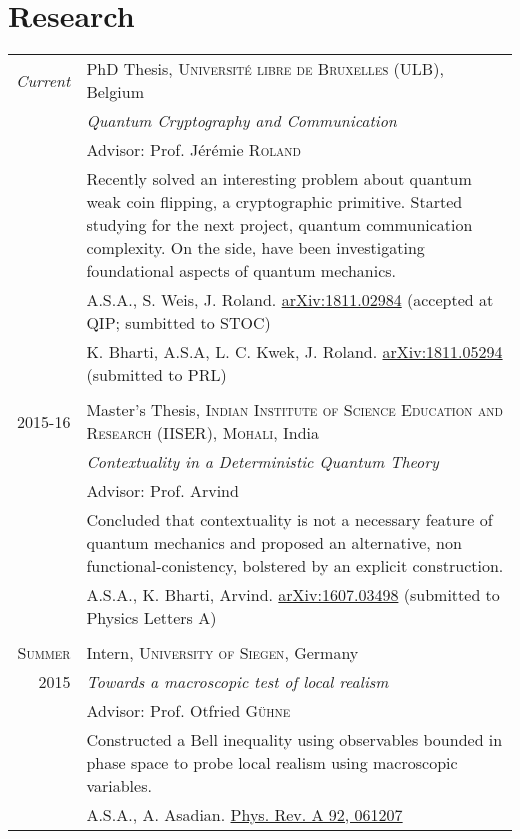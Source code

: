 \documentclass[a4paper,10pt]{article}
\begin{document}
\section{Research}
\begin{tabular}{r|p{11cm}}
 \emph{Current}     & PhD Thesis, \textsc{Université libre de Bruxelles (ULB)}, Belgium \\
                    &\emph{Quantum Cryptography and Communication} \\
                    &\small Advisor: Prof. Jérémie \textsc{Roland}\\
 &\footnotesize{  Recently solved an interesting problem about quantum weak coin flipping, a cryptographic primitive.
                  Started studying for the next project, quantum communication complexity.
                  On the side, have been investigating foundational aspects of quantum mechanics.}\\
                    &\small{A.S.A., S. Weis, J. Roland. \hyperlink{https://arxiv.org/abs/1811.02984}{arXiv:1811.02984} (accepted at QIP; sumbitted to STOC) }\\
                    &\small{K. Bharti, A.S.A, L. C. Kwek, J. Roland. \hyperlink{https://arxiv.org/abs/1811.05294}{arXiv:1811.05294} (submitted to PRL) }\\
 \multicolumn{2}{c}{} \\

 \textsc{2015-16} & Master's Thesis, \textsc{Indian Institute of Science Education and Research (IISER), Mohali}, India \\
                  &\emph{Contextuality in a Deterministic Quantum Theory}\\
                  &\small Advisor: Prof. Arvind\\  
                  &\footnotesize{Concluded that contextuality is not a necessary feature of quantum mechanics and proposed an alternative, non functional-conistency, bolstered by an explicit construction. }\\
                  &\small{A.S.A., K. Bharti, Arvind. \hyperlink{https://arxiv.org/abs/1607.03498}{arXiv:1607.03498} (submitted to Physics Letters A)}\\            
\multicolumn{2}{c}{} \\

\textsc{Summer}   & Intern, \textsc{University of Siegen}, Germany\\
2015                  & \emph{Towards a macroscopic test of local realism}\\
                      & \small Advisor: Prof. Otfried \textsc{Gühne}\\
                      & \footnotesize{Constructed a Bell inequality using observables bounded in phase space to probe local realism using macroscopic variables.} \\
                      & \small{A.S.A., A. Asadian. \hyperlink{http://dx.doi.org/10.1103/PhysRevA.92.062107}{Phys. Rev. A 92, 061207} }\\


\end{tabular}
\end{document}
